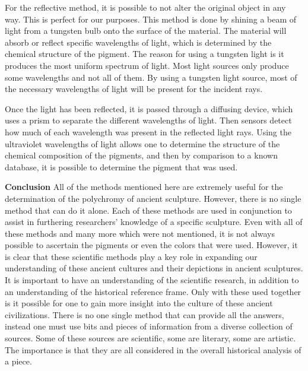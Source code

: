 \documentclass[10pt]{armath}
\begin{document}
For the reflective method, it is possible to not alter the original object in
any way. This is perfect for our purposes. This method is done by shining a
beam of light from a tungsten bulb onto the surface of the material. The
material will absorb or reflect specific wavelengths of light, which is
determined by the chemical structure of the pigment. The reason for using a
tungsten light is it produces the most uniform spectrum of light. Most light
sources only produce some wavelengths and not all of them. By using a tungsten
light source, most of the necessary wavelengths of light will be present for
the incident rays.

Once the light has been reflected, it is passed through a diffusing device,
which uses a prism to separate the different wavelengths of light. Then sensors
detect how much of each wavelength was present in the reflected light rays.
Using the ultraviolet wavelengths of light allows one to determine the
structure of the chemical composition of the pigments, and then by comparison
to a known database, it is possible to determine the pigment that was used.

\textbf{Conclusion} All of the methods mentioned here are extremely useful for
the determination of the polychromy of ancient sculpture. However, there is no
single method that can do it alone. Each of these methods are used in
conjunction to assist in furthering researchers' knowledge of a specific
sculpture. Even with all of these methods and many more which were not
mentioned, it is not always possible to ascertain the pigments or even the
colors that were used. However, it is clear that these scientific methods play
a key role in expanding our understanding of these ancient cultures and their
depictions in ancient sculptures. It is important to have an understanding of
the scientific research, in addition to an understanding of the historical
reference frame.  Only with these used together is it possible for one to gain
more insight into the culture of these ancient civilizations. There is no one
single method that can provide all the answers, instead one must use bits and
pieces of information from a diverse collection of sources. Some of these
sources are scientific, some are literary, some are artistic. The importance is
that they are all considered in the overall historical analysis of a piece.

\nocite{*}
\printbibliography
\end{document}
